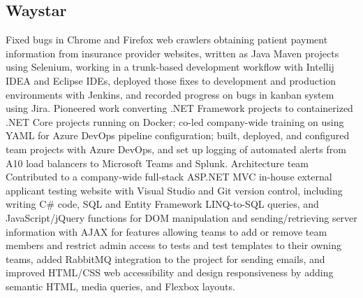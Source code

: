 \subsection{Waystar}
{
	Fixed bugs in Chrome and Firefox web crawlers obtaining patient payment information from insurance provider websites, written as Java Maven projects using Selenium, working in a trunk-based development workflow with Intellij IDEA and Eclipse IDEs, deployed those fixes to development and production environments with Jenkins, and recorded progress on bugs in kanban system using Jira.
}
{
	Pioneered work converting .NET Framework projects to containerized .NET Core projects running on Docker; co-led company-wide training on using YAML for Azure DevOps pipeline configuration; built, deployed, and configured team projects with Azure DevOps, and set up logging of automated alerts from A10 load balancers to Microsoft Teams and Splunk.
}
{Architecture team}
{}
{
	Contributed to a company-wide full-stack ASP.NET MVC in-house external applicant testing website with Visual Studio and Git version control, 
	including writing C\# code, 
	SQL and Entity Framework LINQ-to-SQL queries, 
	and JavaScript/jQuery functions for DOM manipulation and sending/retrieving server information with AJAX for features allowing teams to add or remove team members and restrict admin access to tests and test templates to their owning teams, 
	added RabbitMQ integration to the project for sending emails,
	and improved HTML/CSS web accessibility and design responsiveness by adding semantic HTML, 
	media queries, 
	and Flexbox layouts.
}
